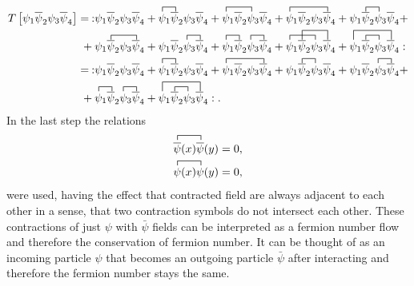 \begin{align*}
		T\left[\psi_1\overline{\psi}_2\psi_3\overline{\psi}_4\right]=\:
		:&\psi_1\overline{\psi}_2\psi_3\overline{\psi}_4+
		\contraction{}{\psi}{{}_1}{\psi}\psi_1\overline{\psi}_2\psi_3\overline{\psi}_4+
		\contraction{}{\psi}{\psi_2{}_3}{\psi}\psi_1\overline{\psi}_2\psi_3\overline{\psi}_4+
		\contraction{}{\psi}{\psi_2\psi_3{}_4}{\psi}\psi_1\overline{\psi}_2\psi_3\overline{\psi}_4+
		\contraction{\psi_1}{\psi}{{}_1}{\psi}\psi_1\overline{\psi}_2\psi_3\overline{\psi}_4+\\
		+\:\contraction{\psi_1}{\psi}{\psi_2{}_3}{\psi}&\psi_1\overline{\psi}_2\psi_3\overline{\psi}_4+
		\contraction{\psi_1\psi_2}{\psi}{{}_4}{\psi}\psi_1\overline{\psi}_2\psi_3\overline{\psi}_4+
		\contraction{}{\psi}{{}_1}{\bar{\psi}}\contraction{\psi_1\psi_2}{\psi}{{}_3}{\bar{\psi}}\psi_1\overline{\psi}_2\psi_3\overline{\psi}_4+
		\contraction{}{\psi}{{}_1\psi_2}{\psi}\contraction[2ex]{\psi_1}{\psi}{{}_2\psi_3}{\psi}\psi_1\overline{\psi}_2\psi_3\overline{\psi}_4+
		\contraction[2ex]{}{\psi}{{}_1\psi_2\psi_3}{\psi}\contraction{\psi_1}{\psi}{{}_2}{\psi}\psi_1\overline{\psi}_2\psi_3\overline{\psi}_4:\:\\
		=\::&\psi_1\overline{\psi}_2\psi_3\overline{\psi}_4+\contraction{}{\psi}{{}_1}{\psi}\psi_1\overline{\psi}_2\psi_3\overline{\psi}_4+\contraction{}{\psi}{\psi_2\psi_3{}_4}{\psi}\psi_1\overline{\psi}_2\psi_3\overline{\psi}_4+\contraction{\psi_1}{\psi}{{}_1}{\psi}\psi_1\overline{\psi}_2\psi_3\overline{\psi}_4+\contraction{\psi_1\psi_2}{\psi}{{}_4}{\psi}\psi_1\overline{\psi}_2\psi_3\overline{\psi}_4+\\
		+\:\contraction{}{\psi}{{}_1}{\bar{\psi}}\contraction{\psi_1\psi_2}{\psi}{{}_3}{\bar{\psi}}&\psi_1\overline{\psi}_2\psi_3\overline{\psi}_4+\contraction[2ex]{}{\psi}{{}_1\psi_2\psi_3}{\psi}\contraction{\psi_1}{\psi}{{}_2}{\psi}\psi_1\overline{\psi}_2\psi_3\overline{\psi}_4: .
\end{align*}
In the last step the relations
\begin{align}
	\contraction{}{\overline{\psi}}{(x)}{\bar{\psi}}
	\overline{{\psi}}(x)\overline{\psi}(y)=0,
	\label{eq:selfcontraction1}
	\\
	\contraction{}{\psi}{(x)}{\psi}
	\psi(x)\psi(y)=0,
	\label{eq:selfcontraction2}
\end{align}
were used, having the effect that contracted field are always adjacent to each other in a sense, that two contraction symbols do not intersect each other. These contractions of just $\psi$ with $\bar{\psi}$ fields can be interpreted as a fermion number flow and therefore the conservation of fermion number. It can be thought of as an incoming particle $\psi$ that becomes an outgoing particle $\bar{\psi}$ after interacting and therefore the fermion number stays the same.\newline\indent
